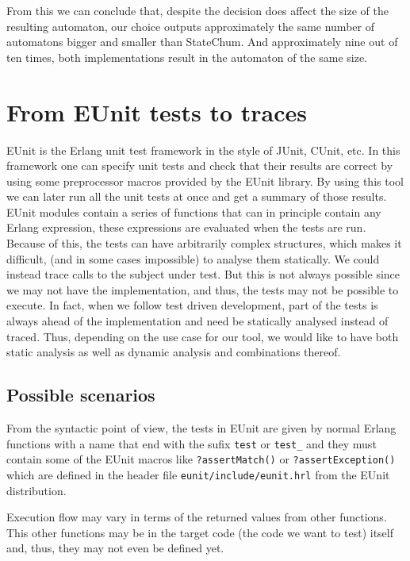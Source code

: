 \documentclass[]{sigplanconf}
\begin{document}
From this we can conclude that, despite the decision does affect the size of
the resulting automaton, our choice
outputs approximately the same number of automatons bigger and smaller than
StateChum. And approximately nine out of ten times, both implementations result
in the automaton of the same size.


\section{From EUnit tests to traces}
\label{EunitToTraces}

EUnit \cite{eunit,eunit_user_guide} is the Erlang unit test framework in the
style of JUnit, CUnit, etc. In this framework one can specify unit tests
and check that their results are correct by using some preprocessor macros
provided by the EUnit library. By using this tool we can later run all
the unit tests at once and get a summary of those results.
EUnit modules contain a series of functions that can in principle
contain any Erlang expression, these expressions are
evaluated when the tests are run. Because of this, the tests
can have arbitrarily complex structures, which makes it difficult, (and
in some cases impossible) to analyse them statically. We could instead
trace calls to the subject under test. But this is not always possible since we may not have
the implementation, and thus, the tests may not be possible to execute.
In fact, when we follow test driven development, part of the tests is always ahead
of the implementation and need be statically analysed instead of traced.
Thus, depending on the use case for our tool, we would
like to have both static analysis as well as dynamic analysis and combinations
thereof. 

\subsection{Possible scenarios}

From the syntactic point of view, the tests in EUnit are given by
normal Erlang functions with a name that end with the sufix \texttt{test}
or \texttt{test\_} and they must contain some of the EUnit macros
like \texttt{?assertMatch()} or \texttt{?assertException()} which are
defined in the header file \texttt{eunit/include/eunit.hrl} from the
EUnit distribution.

Execution flow may vary in terms of the returned values
from other functions. This other functions may be in the target code
(the code we want to test) itself and, thus, they may not even be
defined yet.
\end{document}
